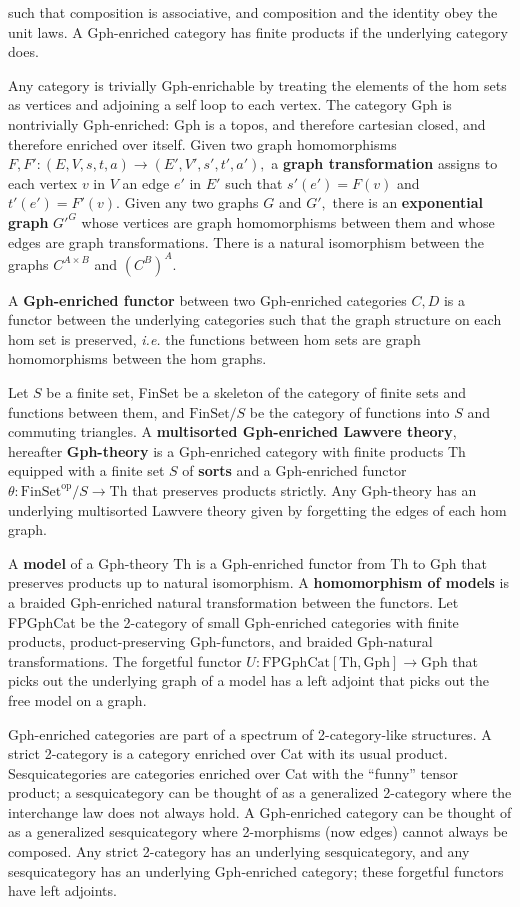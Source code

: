 \documentclass[a4paper,UKenglish]{article}
\newcommand{\Th}{\mathrm{Th}}
\newcommand{\Gph}{\mathrm{Gph}}
\newcommand{\FinSet}{\mathrm{FinSet}}
\newcommand{\op}{\mathrm{op}}
\begin{document}
such that composition is associative, and composition and the identity obey the unit laws.  A Gph-enriched category has finite products if the underlying category does.

Any category is trivially Gph-enrichable by treating the elements of the hom sets as vertices and adjoining a self loop to each vertex. The category Gph is nontrivially Gph-enriched: Gph is a topos, and therefore cartesian closed, and therefore enriched over itself.  Given two graph homomorphisms $F, F'\colon (E, V, s, t, a) \to (E', V', s', t', a'),$ a {\bf graph transformation} assigns to each vertex $v$ in $V$ an edge $e'$ in $E'$ such that $s'(e') = F(v)$ and $t'(e') = F'(v).$ Given any two graphs $G$ and $G',$ there is an {\bf exponential graph} $G'^G$ whose vertices are graph homomorphisms between them and whose
edges are graph transformations.  There is a natural isomorphism between the graphs $C^{A\times B}$ and $(C^B)^A.$

A {\bf Gph-enriched functor} between two Gph-enriched categories $C, D$ is a functor between the underlying categories such that the graph structure on each hom set is preserved, {\em i.e.} the functions between hom sets are graph homomorphisms between the hom graphs.

Let $S$ be a finite set, FinSet be a skeleton of the category of finite sets and functions between them, and $\mbox{FinSet}/S$ be the category of functions into $S$ and commuting triangles.  A {\bf multisorted Gph-enriched Lawvere theory}, hereafter {\bf Gph-theory}
is a Gph-enriched category with finite products Th equipped with a finite set $S$ of {\bf sorts} and a Gph-enriched functor $\theta\colon \FinSet^\op/S \to \Th$ that preserves products
strictly.  Any Gph-theory has an underlying multisorted Lawvere theory given by forgetting the edges of each hom graph.

A {\bf model} of a Gph-theory Th is a Gph-enriched functor from Th to Gph that preserves products up to natural isomorphism.  A {\bf homomorphism of models} is a braided Gph-enriched natural transformation between the functors.  Let FPGphCat be the 2-category of small Gph-enriched categories with finite products, product-preserving Gph-functors, and braided Gph-natural transformations.  The forgetful functor $U\colon \mbox{FPGphCat}[\Th, \Gph] \to \Gph$ that picks out the underlying
graph of a model has a left adjoint that picks out the free model on a graph.

Gph-enriched categories are part of a spectrum of 2-category-like structures.  A strict 2-category is a category enriched over Cat with its usual product.  Sesquicategories are categories enriched over Cat with the ``funny'' tensor product; a sesquicategory can be thought of as a generalized 2-category where the interchange law does not always hold.  A Gph-enriched category can be thought of as a generalized sesquicategory where 2-morphisms (now edges) cannot always be composed.  Any strict 2-category has an underlying sesquicategory, and any sesquicategory has an underlying Gph-enriched category; these forgetful functors have left adjoints.
\end{document}
